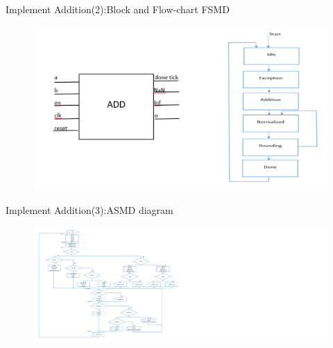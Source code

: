 \documentclass[11pt]{beamer}
\begin{document}
\begin{frame}[t]{Implement Addition(2):Block and Flow-chart FSMD}
\begin{center}
    \begin{figure}[htp]
    \begin{center}
     \includegraphics[scale=.35]{image/fig12}
    \end{center}
    \label{reffig12}
    \end{figure}
\end{center}

\end{frame}
\begin{frame}[t]{Implement Addition(3):ASMD diagram}
\begin{center}
    \begin{figure}[htp]
    \begin{center}
     \includegraphics[scale=.33]{image/asmdadd}
    \end{center}
    \label{refasmdadd}
    \end{figure}
\end{center}
\end{frame}
\end{document}
